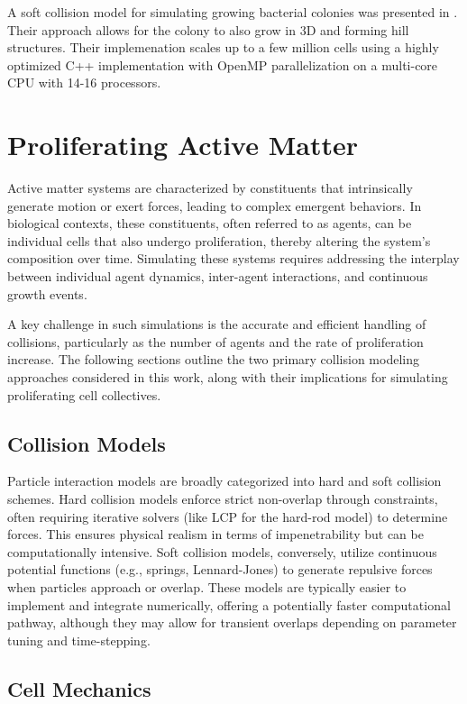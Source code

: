 \documentclass[conference]{IEEEtran}
\begin{document}
A soft collision model for simulating growing bacterial colonies was presented in \cite{Warren2019}. Their approach allows for the colony to also grow in 3D and forming hill structures. Their implemenation scales up to a few million cells using a highly optimized C++ implementation with OpenMP parallelization on a multi-core CPU with 14-16 processors.

\section{Proliferating Active Matter}

Active matter systems are characterized by constituents that intrinsically generate motion or exert forces, leading to complex emergent behaviors. In biological contexts, these constituents, often referred to as agents, can be individual cells that also undergo proliferation, thereby altering the system's composition over time. Simulating these systems requires addressing the interplay between individual agent dynamics, inter-agent interactions, and continuous growth events.

A key challenge in such simulations is the accurate and efficient handling of collisions, particularly as the number of agents and the rate of proliferation increase. The following sections outline the two primary collision modeling approaches considered in this work, along with their implications for simulating proliferating cell collectives.

\subsection{Collision Models}

Particle interaction models are broadly categorized into hard and soft collision schemes. Hard collision models enforce strict non-overlap through constraints, often requiring iterative solvers (like LCP for the hard-rod model) to determine forces. This ensures physical realism in terms of impenetrability but can be computationally intensive. Soft collision models, conversely, utilize continuous potential functions (e.g., springs, Lennard-Jones) to generate repulsive forces when particles approach or overlap. These models are typically easier to implement and integrate numerically, offering a potentially faster computational pathway, although they may allow for transient overlaps depending on parameter tuning and time-stepping.


\subsection{Cell Mechanics}
\end{document}
